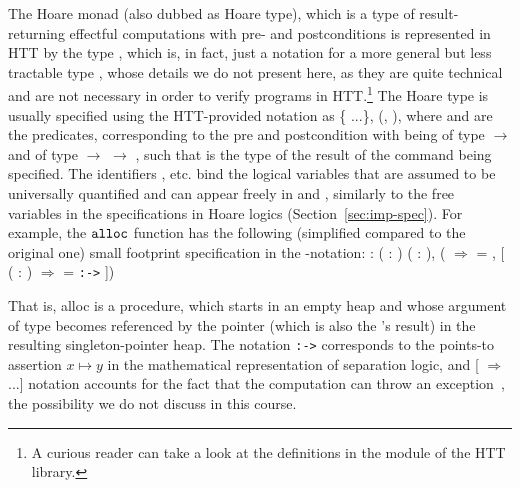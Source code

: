The Hoare monad (also dubbed as Hoare type), which is a type of
result-returning effectful computations with pre- and postconditions
is represented in HTT by the type , which is, in fact, just a
notation for a more general but less tractable type , whose
details we do not present here, as they are quite technical and are
not necessary in order to verify programs in HTT.\footnote{A curious
reader can take a look at the definitions in the module  of
the HTT library.}
The Hoare type is usually specified using the HTT-provided notation as
\{  ...\},  (, ), where  and  are the predicates,
corresponding to the pre and postcondition with  being of type
 \ensuremath{\rightarrow}  and  of type  \ensuremath{\rightarrow}  \ensuremath{\rightarrow} , such that  is
the type of the result of the command being specified. The identifiers
,  etc. bind the logical variables that are assumed to be
universally quantified and can appear freely in  and , similarly
to the free variables in the specifications in Hoare logics
(Section~\ref{sec:imp-spec}). For example, the $\mathtt{alloc}$
function has the following (simplified compared to the original one)
small footprint specification in the -notation:
\coqdoceol
\coqdocemptyline
\coqdocnoindent
{} : \coqdockw{\ensuremath{\forall}} ( : ) ( : ),\coqdoceol
\coqdocindent{5.50em}
 (  \ensuremath{\Rightarrow}  = ,\coqdoceol
\coqdocindent{8.50em}
[ ( : )  \ensuremath{\Rightarrow}  =  \texttt{:->} ])

\coqdocemptyline
{}
That is, alloc is a procedure, which starts in an empty heap 
and whose argument  of type  becomes referenced by the pointer
(which is also the 's result) in the resulting
singleton-pointer heap. The notation  \texttt{:->}  corresponds to the
points-to assertion $x \mapsto y$ in the mathematical representation
of separation logic, and [  \ensuremath{\Rightarrow} ...] notation accounts for the
fact that the computation can throw an
exception~\cite{Nanevski-al:JFP08}, the possibility we do not
discuss in this course.
